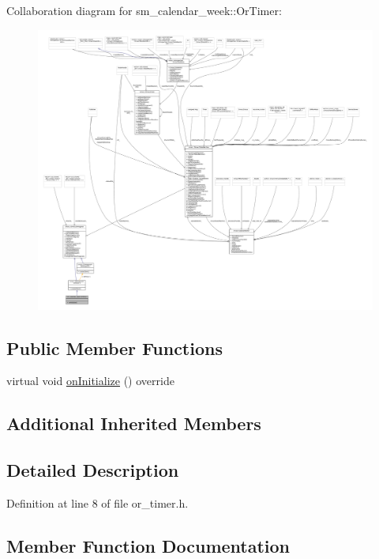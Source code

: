 Collaboration diagram for sm\+\_\+calendar\+\_\+week\+:\+:Or\+Timer\+:
\nopagebreak
\begin{figure}[H]
\begin{center}
\leavevmode
\includegraphics[width=350pt]{classsm__calendar__week_1_1OrTimer__coll__graph}
\end{center}
\end{figure}
\subsection*{Public Member Functions}
\begin{DoxyCompactItemize}
\item 
virtual void \hyperlink{classsm__calendar__week_1_1OrTimer_a11daa3f172f896e3956cd4747aab5ab8}{on\+Initialize} () override
\end{DoxyCompactItemize}
\subsection*{Additional Inherited Members}


\subsection{Detailed Description}


Definition at line 8 of file or\+\_\+timer.\+h.



\subsection{Member Function Documentation}
